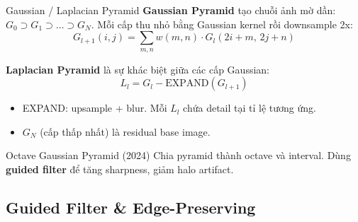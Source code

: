 \documentclass{beamer}
\begin{document}
\begin{frame}{Gaussian / Laplacian Pyramid}
    \small
    \textbf{Gaussian Pyramid} tạo chuỗi ảnh mờ dần: $G_0 \supset G_1 \supset \ldots \supset G_N$. Mỗi cấp thu nhỏ bằng Gaussian kernel rồi downsample 2x:
    \vspace{-0.1cm}
    \begin{equation}
        G_{l+1}(i,j) = \sum_{m,n} w(m,n) \cdot G_l(2i+m,\, 2j+n)
    \end{equation}

    \vspace{-0.1cm}
    \textbf{Laplacian Pyramid} là sự khác biệt giữa các cấp Gaussian:
    \vspace{-0.1cm}
    \begin{equation}
        L_l = G_l - \text{EXPAND}(G_{l+1})
    \end{equation}
    \vspace{-0.2cm}
    \begin{itemize}\setlength{\itemsep}{1pt}
        \item EXPAND: upsample + blur. Mỗi $L_l$ chứa detail tại tỉ lệ tương ứng.
        \item $G_N$ (cấp thấp nhất) là residual base image.
    \end{itemize}

    \vspace{0.1cm}
    \begin{exampleblock}{\footnotesize Octave Gaussian Pyramid (2024)}
        \footnotesize Chia pyramid thành octave và interval. Dùng \textbf{guided filter} để tăng sharpness, giảm halo artifact.
    \end{exampleblock}
\end{frame}

\subsection{Guided Filter \& Edge-Preserving}
\end{document}
